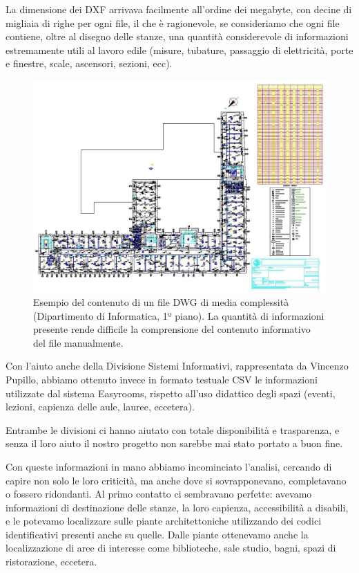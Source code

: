 \documentclass[12pt]{report}
\begin{document}
La dimensione dei DXF arrivava facilmente all'ordine dei
megabyte, con decine di migliaia di righe per ogni file, il che è ragionevole, se
consideriamo che ogni file contiene, oltre al disegno delle stanze, una 
quantità considerevole di informazioni estremamente utili al lavoro edile
(misure, tubature, passaggio di elettricità, porte e finestre, scale, 
ascensori, sezioni, ecc).

\begin{figure}[H]
    \centering
    \includegraphics[width=\textwidth,natwidth=1127,natheight=815]{03-dxf-chaos.jpg}
    \caption{Esempio del contenuto di un file DWG di media complessità
(Dipartimento di Informatica, 1º piano). La quantità di informazioni
presente rende difficile la comprensione del contenuto informativo
del file manualmente. }
    \label{fig:dxf_chaos}
\end{figure}

Con l'aiuto anche della Divisione Sistemi Informativi, rappresentata
da Vincenzo Pupillo, abbiamo ottenuto invece in formato testuale CSV le
informazioni utilizzate dal sistema Easyrooms, rispetto all'uso didattico
degli spazi (eventi, lezioni, capienza delle aule, lauree, eccetera).

Entrambe le divisioni ci hanno aiutato con totale disponibilità e
trasparenza, e senza il loro aiuto il nostro progetto non sarebbe mai
stato portato a buon fine.

Con queste informazioni in mano abbiamo incominciato l'analisi,
cercando di capire non solo le loro criticità, ma anche dove si
sovrapponevano, completavano o fossero ridondanti. Al primo contatto
ci sembravano perfette: avevamo informazioni di destinazione delle
stanze, la loro capienza, accessibilità a disabili, e le potevamo
localizzare sulle piante architettoniche utilizzando dei codici
identificativi presenti anche su quelle. Dalle piante ottenevamo anche
la localizzazione di aree di interesse come biblioteche, sale studio, bagni,
spazi di ristorazione, eccetera.
\end{document}
